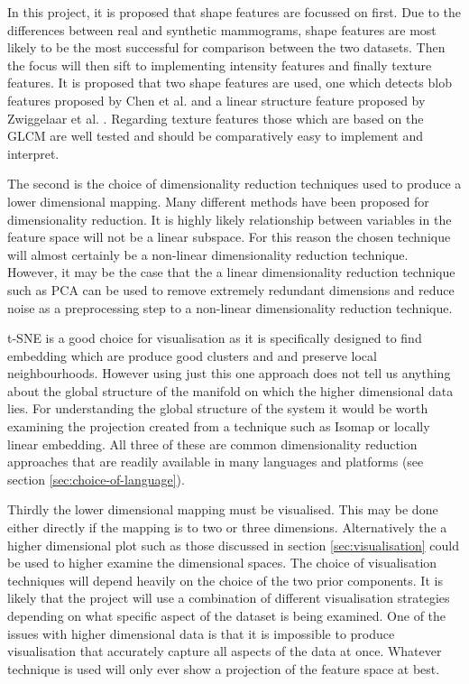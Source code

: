 In this project, it is proposed that shape features are focussed on first. Due to the differences between real and synthetic mammograms, shape features are most likely to be the most successful for comparison between the two datasets. Then the focus will then sift to implementing intensity features and finally texture features. It is proposed that two shape features are used, one which detects blob features proposed by Chen et al. \cite{chen2013multiscale} and a linear structure feature proposed by Zwiggelaar et al. \cite{zwiggelaar1996finding}. Regarding texture features those which are based on the GLCM \cite{haralick1973textural} are well tested and should be comparatively easy to implement and interpret. 

The second is the choice of dimensionality reduction techniques used to produce a lower dimensional mapping. Many different methods have been proposed for dimensionality reduction. It is highly likely relationship between variables in the feature space will not be a linear subspace. For this reason the chosen technique will almost certainly be a non-linear dimensionality reduction technique. However, it may be the case that the a linear dimensionality reduction technique such as PCA can be used to remove extremely redundant dimensions and reduce noise as a preprocessing step to a non-linear dimensionality reduction technique. 

t-SNE is a good choice for visualisation as it is specifically designed to find embedding which are produce good clusters and and preserve local neighbourhoods. However using just this one approach does not tell us anything about the global structure of the manifold on which the higher dimensional data lies. For understanding the global structure of the system it would be worth examining the projection created from a technique such as Isomap or locally linear embedding. All three of these are common dimensionality reduction approaches that are readily available in many languages and platforms (see section \ref{sec:choice-of-language}).

Thirdly the lower dimensional mapping must be visualised. This may be done either directly if the mapping is to two or three dimensions. Alternatively the a higher dimensional plot such as those discussed in section \ref{sec:visualisation} could be used to higher examine the dimensional spaces. The choice of visualisation techniques will depend heavily on the choice of the two prior components. It is likely that the project will use a combination of different visualisation strategies depending on what specific aspect of the dataset is being examined. One of the issues with higher dimensional data is that it is impossible to produce visualisation that accurately capture all aspects of the data at once. Whatever technique is used will only ever show a projection of the feature space at best.

